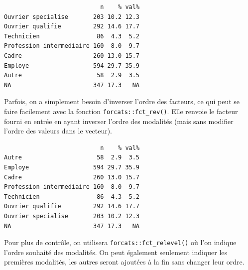 \documentclass[
  letterpaper,
  DIV=11,
  numbers=noendperiod,
  oneside]{scrreprt}
\newenvironment{Shaded}{\begin{snugshade}}{\end{snugshade}}
\newcommand{\FunctionTok}[1]{\textcolor[rgb]{0.28,0.35,0.67}{#1}}
\newcommand{\NormalTok}[1]{\textcolor[rgb]{0.00,0.23,0.31}{#1}}
\newcommand{\SpecialCharTok}[1]{\textcolor[rgb]{0.37,0.37,0.37}{#1}}
\newcommand{\StringTok}[1]{\textcolor[rgb]{0.13,0.47,0.30}{#1}}
\begin{document}
\begin{Shaded}
\end{Shaded}

\begin{verbatim}
                           n    % val%
Ouvrier specialise       203 10.2 12.3
Ouvrier qualifie         292 14.6 17.7
Technicien                86  4.3  5.2
Profession intermediaire 160  8.0  9.7
Cadre                    260 13.0 15.7
Employe                  594 29.7 35.9
Autre                     58  2.9  3.5
NA                       347 17.3   NA
\end{verbatim}

Parfois, on a simplement besoin d'inverser l'ordre des facteurs, ce qui
peut se faire facilement avec la fonction \texttt{forcats::fct\_rev()}.
Elle renvoie le facteur fourni en entrée en ayant inverser l'ordre des
modalités (mais sans modifier l'ordre des valeurs dans le vecteur).

\begin{Shaded}
\end{Shaded}

\begin{verbatim}
                           n    % val%
Autre                     58  2.9  3.5
Employe                  594 29.7 35.9
Cadre                    260 13.0 15.7
Profession intermediaire 160  8.0  9.7
Technicien                86  4.3  5.2
Ouvrier qualifie         292 14.6 17.7
Ouvrier specialise       203 10.2 12.3
NA                       347 17.3   NA
\end{verbatim}

Pour plus de contrôle, on utilisera \texttt{forcats::fct\_relevel()} où
l'on indique l'ordre souhaité des modalités. On peut également seulement
indiquer les premières modalités, les autres seront ajoutées à la fin
sans changer leur ordre.

\begin{Shaded}
\end{Shaded}
\end{document}
